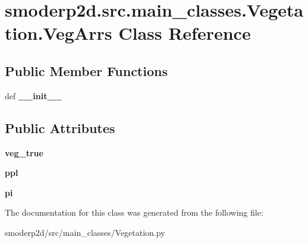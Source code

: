 \hypertarget{classsmoderp2d_1_1src_1_1main__classes_1_1Vegetation_1_1VegArrs}{\section{smoderp2d.\-src.\-main\-\_\-classes.\-Vegetation.\-Veg\-Arrs Class Reference}
\label{classsmoderp2d_1_1src_1_1main__classes_1_1Vegetation_1_1VegArrs}
}
\subsection*{Public Member Functions}
\begin{DoxyCompactItemize}
\item 
\hypertarget{classsmoderp2d_1_1src_1_1main__classes_1_1Vegetation_1_1VegArrs_aa10c88b822b18c2d6b19954c8d2cc8dd}{def {\bfseries \-\_\-\-\_\-init\-\_\-\-\_\-}}\label{classsmoderp2d_1_1src_1_1main__classes_1_1Vegetation_1_1VegArrs_aa10c88b822b18c2d6b19954c8d2cc8dd}

\end{DoxyCompactItemize}
\subsection*{Public Attributes}
\begin{DoxyCompactItemize}
\item 
\hypertarget{classsmoderp2d_1_1src_1_1main__classes_1_1Vegetation_1_1VegArrs_a16b63c13be70c6dad44bf2e0773c9ad2}{{\bfseries veg\-\_\-true}}\label{classsmoderp2d_1_1src_1_1main__classes_1_1Vegetation_1_1VegArrs_a16b63c13be70c6dad44bf2e0773c9ad2}

\item 
\hypertarget{classsmoderp2d_1_1src_1_1main__classes_1_1Vegetation_1_1VegArrs_ad7a7ce1bf3b553b5830e26e024bfc80f}{{\bfseries ppl}}\label{classsmoderp2d_1_1src_1_1main__classes_1_1Vegetation_1_1VegArrs_ad7a7ce1bf3b553b5830e26e024bfc80f}

\item 
\hypertarget{classsmoderp2d_1_1src_1_1main__classes_1_1Vegetation_1_1VegArrs_a76bc6f578cf57962308c935b08fdcade}{{\bfseries pi}}\label{classsmoderp2d_1_1src_1_1main__classes_1_1Vegetation_1_1VegArrs_a76bc6f578cf57962308c935b08fdcade}

\end{DoxyCompactItemize}


The documentation for this class was generated from the following file\-:\begin{DoxyCompactItemize}
\item 
smoderp2d/src/main\-\_\-classes/Vegetation.\-py\end{DoxyCompactItemize}
